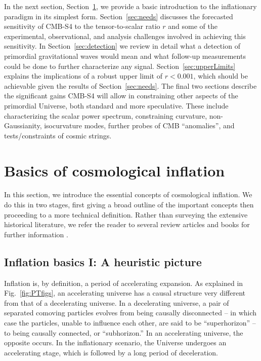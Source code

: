 In the next section, Section~\ref{sec:basics}, we provide a basic introduction to the inflationary paradigm in its simplest form. Section~\ref{sec:needs} discusses the forecasted sensitivity of CMB-S4 to the tensor-to-scalar ratio $r$ and some of the experimental, observational, and analysis challenges involved in achieving this sensitivity. In Section~\ref{sec:detection} we review in detail what a detection of primordial gravitational waves would mean and what follow-up measurements could be done to further characterize any signal. Section~\ref{sec:upperLimits} explains the implications of a robust upper limit of $r<0.001$, which should be achievable given the results of Section~\ref{sec:needs}. The final two sections describe the significant gains CMB-S4 will allow in constraining other aspects of the primordial Universe, both standard and more speculative. These include characterizing the scalar power spectrum, constraining curvature, non-Gaussianity, isocurvature modes, further probes of CMB ``anomalies'', and tests/constraints of cosmic strings.
 


\section{Basics of cosmological inflation}
\label{sec:basics}

In this section, we introduce the essential concepts of cosmological inflation. We do this in two stages, first giving a broad outline of the important concepts then proceeding to a more technical definition.  Rather than surveying the extensive historical literature, we refer the reader to several review articles and books for further information
\cite{LythRiotto,LiddleLyth,Mukhanov2005,Baumann:2009ds,Linde2006,EllisWands}.

\subsection{Inflation basics I: A heuristic picture}

Inflation is, by definition, a period of accelerating expansion. As explained in Fig.~\ref{fig:PTfigs}, an accelerating universe has a causal structure very different from that of a decelerating universe. In a decelerating universe, a pair of separated comoving particles evolves from being causally disconnected -- in which case the particles, unable to influence each other, are said to be ``superhorizon'' -- to being causally connected, or ``subhorizon.'' In an accelerating universe, the opposite occurs. In the inflationary scenario, the Universe undergoes an accelerating stage, which is followed by a long period of deceleration.


